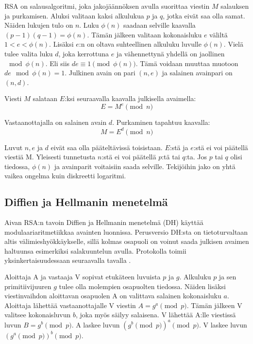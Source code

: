 \documentclass[finnish]{tktltiki2}
\theoremstyle{definition}
\theoremstyle{remark}
\begin{document}
RSA on salausalgoritmi, joka jakojäännöksen avulla suorittaa viestin $M$ salauksen ja purkamisen. Aluksi valitaan kaksi alkulukua $p$ ja $q$, jotka eivät saa olla samat. Näiden lukujen tulo on $n$. Luku $\phi(n)$ saadaan selville kaavalla $(p-1)(q-1) = \phi(n)$. Tämän jälkeen valitaan kokonaisluku $e$ väliltä $1 < e < \phi(n)$. Lisäksi $e$:n on oltava suhteellinen alkuluku luvulle $\phi(n)$. Vielä tulee valita luku $d$, joka kerrottuna $e$ ja vähennettynä yhdellä on jaollinen$\mod{\phi(n)}$. Eli siis $d e \equiv 1\pmod{\phi(n)}$. Tämä voidaan muuttaa muotoon $de \mod{\phi(n)} = 1$. Julkinen avain on pari $(n, e)$ ja salainen avainpari on $(n, d)$.   

Viesti $M$ salataan $E$:ksi seuraavalla kaavalla julkisella avaimella: $$E = M^e \pmod{n}$$

Vastaanottajalla on salainen avain $d$. Purkaminen tapahtuu kaavalla: 
$$ M = E^d \pmod{n} $$

Luvut $n, e$ ja $d$ eivät saa olla pääteltävissä toisistaan. $E$:stä ja $e$:stä ei voi päätellä viestiä M. Yleisesti tunnetusta $n$:stä ei voi päätellä $p$:tä tai $q$:ta. Jos $p$ tai $q$ olisi tiedossa, $\phi(n)$ ja avainparit voitaisiin saada selville. Tekijöihin jako on yhtä vaikea ongelma kuin diskreetti logaritmi. \cite{math1}


\subsection{Diffien ja Hellmanin menetelmä}

Aivan RSA:n tavoin Diffien ja Hellmanin menetelmä (DH) käyttää modulaariaritmetiikkaa avainten luonnissa. Perusversio DH:sta on tietoturvaltaan altis välimieshyökkäykselle, sillä kolmas osapuoli on voinut saada julkisen avaimen haltuunsa esimerkiksi salakuuntelun avulla. Protokolla toimii yksinkertaisuudessaan seuraavalla tavalla \cite{math2}.

Aloittaja A ja vastaaja V sopivat etukäteen luvuista $p$ ja $g$. Alkuluku  $p$ ja sen primitiivijuuren $g$ tulee olla molempien osapuolten tiedossa. Näiden lisäksi viestinvaihdon aloittavan osapuolen A on valittava salainen kokonaisluku $a$. Aloittaja lähettää vastaanottajalle V viestin $A = g^a \pmod{p}$. Tämän jälkeen V valitsee kokonaisluvun $b$, joka myös säilyy salaisena. V lähettää A:lle viestissä luvun $B = g^b \pmod{p}$. A laskee luvun $(g^b \pmod{p})^a \pmod{p}$. V laskee luvun $(g^a \pmod{p})^b \pmod{p}$.
\end{document}
